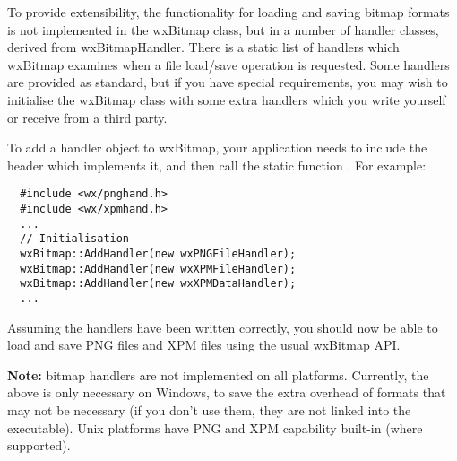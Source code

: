 To provide extensibility, the functionality for loading and saving bitmap formats
is not implemented in the wxBitmap class, but in a number of handler classes,
derived from wxBitmapHandler. There is a static list of handlers which wxBitmap
examines when a file load/save operation is requested. Some handlers are provided as standard, but if you
have special requirements, you may wish to initialise the wxBitmap class with
some extra handlers which you write yourself or receive from a third party.

To add a handler object to wxBitmap, your application needs to include the header which implements it, and
then call the static function . For example:

{\small
\begin{verbatim}
  #include <wx/pnghand.h>
  #include <wx/xpmhand.h>
  ...
  // Initialisation
  wxBitmap::AddHandler(new wxPNGFileHandler);
  wxBitmap::AddHandler(new wxXPMFileHandler);
  wxBitmap::AddHandler(new wxXPMDataHandler);
  ...
\end{verbatim}
}

Assuming the handlers have been written correctly, you should now be able to load and save PNG files
and XPM files using the usual wxBitmap API.

{\bf Note:} bitmap handlers are not implemented on all platforms. Currently, the above is only necessary on
Windows, to save the extra overhead of formats that may not be necessary (if you don't use them, they
are not linked into the executable). Unix platforms have PNG and XPM capability built-in (where supported).

